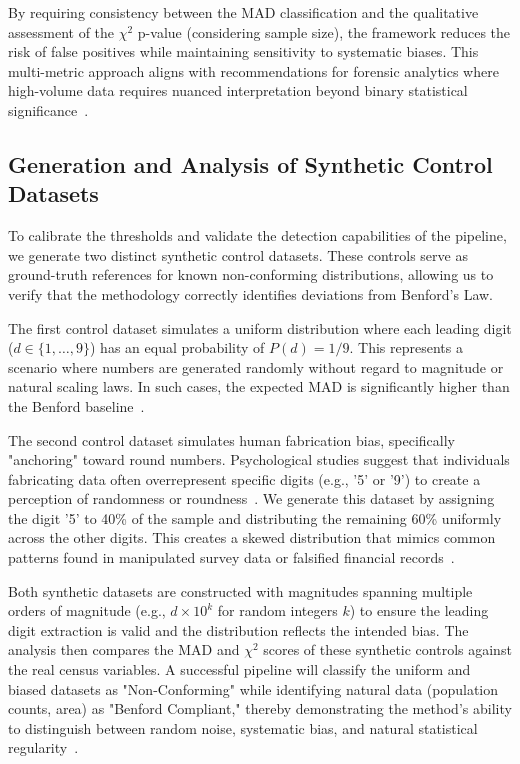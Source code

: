 \documentclass[11pt,a4paper]{article}
\begin{document}
By requiring consistency between the MAD classification and the qualitative assessment of the $\chi^2$ p-value (considering sample size), the framework reduces the risk of false positives while maintaining sensitivity to systematic biases. This multi-metric approach aligns with recommendations for forensic analytics where high-volume data requires nuanced interpretation beyond binary statistical significance~\cite{Miller2015BenfordsLT}.

\subsection{Generation and Analysis of Synthetic Control Datasets}

To calibrate the thresholds and validate the detection capabilities of the pipeline, we generate two distinct synthetic control datasets. These controls serve as ground-truth references for known non-conforming distributions, allowing us to verify that the methodology correctly identifies deviations from Benford's Law.

The first control dataset simulates a uniform distribution where each leading digit ($d \in \{1, \dots, 9\}$) has an equal probability of $P(d) = 1/9$. This represents a scenario where numbers are generated randomly without regard to magnitude or natural scaling laws. In such cases, the expected MAD is significantly higher than the Benford baseline~\cite{Petras2025DetectingBL}.

The second control dataset simulates human fabrication bias, specifically "anchoring" toward round numbers. Psychological studies suggest that individuals fabricating data often overrepresent specific digits (e.g., '5' or '9') to create a perception of randomness or roundness~\cite{Schafer2005AutomatieIO}. We generate this dataset by assigning the digit '5' to 40\% of the sample and distributing the remaining 60\% uniformly across the other digits. This creates a skewed distribution that mimics common patterns found in manipulated survey data or falsified financial records~\cite{Cole2019TestingTE}.

Both synthetic datasets are constructed with magnitudes spanning multiple orders of magnitude (e.g., $d \times 10^k$ for random integers $k$) to ensure the leading digit extraction is valid and the distribution reflects the intended bias. The analysis then compares the MAD and $\chi^2$ scores of these synthetic controls against the real census variables. A successful pipeline will classify the uniform and biased datasets as "Non-Conforming" while identifying natural data (population counts, area) as "Benford Compliant," thereby demonstrating the method's ability to distinguish between random noise, systematic bias, and natural statistical regularity~\cite{Ivanova2025BenfordsLA}.
\end{document}
